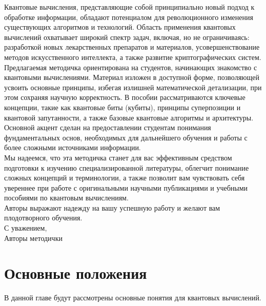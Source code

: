 \documentclass[12pt,a4paper]{article}
\begin{document}
	Квантовые вычисления, представляющие собой принципиально новый подход к обработке информации, обладают потенциалом для революционного изменения существующих алгоритмов и технологий. Область применения квантовых вычислений охватывает широкий спектр задач, включая, но не ограничиваясь: разработкой новых лекарственных препаратов и материалов, усовершенствование методов искусственного интеллекта, а также развитие криптографических систем.\\
	
	Предлагаемая методичка ориентирована на студентов, начинающих знакомство с квантовыми вычислениями. Материал изложен в доступной форме, позволяющей усвоить основные принципы, избегая излишней математической детализации, при этом сохраняя научную корректность. В пособии рассматриваются ключевые концепции, такие как квантовые биты (кубиты), принципы суперпозиции и квантовой запутанности, а также базовые квантовые алгоритмы и архитектуры. Основной акцент сделан на предоставлении студентам понимания фундаментальных основ, необходимых для дальнейшего обучения и работы с более сложными источниками информации.\\
	
	Мы надеемся, что эта методичка станет для вас эффективным средством подготовки к изучению специализированной литературы, облегчит понимание сложных концепций и терминологии, а также позволит вам чувствовать себя увереннее при работе с оригинальными научными публикациями и учебными пособиями по квантовым вычислениям.\\
																								
	
	Авторы выражают надежду на вашу успешную работу и желают вам плодотворного обучения.\\
	
	С уважением,\\ Авторы методички\\
	
	\newpage
	\section{Основные положения}
	В данной главе будут рассмотрены основные понятия для квантовых вычислений.
\end{document}
